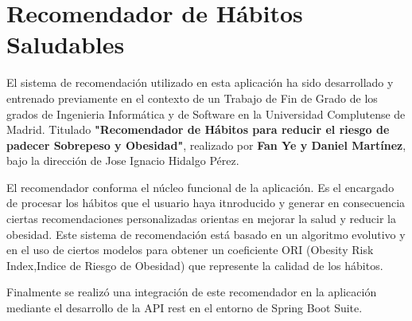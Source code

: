 \section{Recomendador de Hábitos Saludables}

El sistema de recomendación utilizado en esta aplicación ha sido desarrollado y entrenado previamente en el contexto de un Trabajo de Fin de Grado de los grados de Ingenieria Informática y de Software en la Universidad Complutense de Madrid. Titulado \textbf{"Recomendador de Hábitos para reducir el riesgo de padecer Sobrepeso y Obesidad"}, realizado por \textbf{Fan Ye y Daniel Martínez}, bajo la dirección de Jose Ignacio Hidalgo Pérez.

El recomendador conforma el núcleo funcional de la aplicación. Es el encargado de procesar los hábitos que el usuario haya itnroducido y generar en consecuencia ciertas recomendaciones personalizadas orientas en mejorar la salud y reducir la obesidad.
Este sistema de recomendación está basado en un algoritmo evolutivo y en el uso de ciertos modelos para obtener un coeficiente ORI (Obesity Risk Index,Indice de Riesgo de Obesidad) que represente la calidad de los hábitos.

Finalmente se realizó una integración de este recomendador en la aplicación mediante el desarrollo de la API rest en el entorno de Spring Boot Suite.

